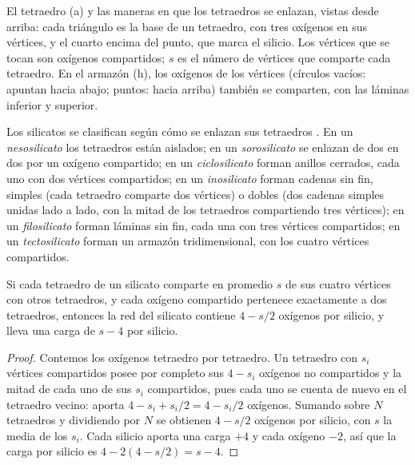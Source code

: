 \begin{omfigure}
{\small El tetraedro  (a) y las maneras en que los tetraedros se enlazan, vistas desde arriba:
cada triángulo es la base de un tetraedro, con tres oxígenos en sus vértices, y el cuarto encima del
punto, que marca el silicio. Los vértices que se tocan son oxígenos compartidos; $s$ es el número de
vértices que comparte cada tetraedro. En el armazón (h), los oxígenos de los vértices (círculos vacíos:
apuntan hacia abajo; puntos: hacia arriba) también se comparten, con las láminas inferior y superior.}
\end{omfigure}

\begin{definition}\label{def:b1:rock-forming-minerals:silicate-classes}
Los silicatos se clasifican según cómo se enlazan sus tetraedros . En un
\emph{nesosilicato} los tetraedros están aislados; en un
\emph{sorosilicato} se enlazan de dos en dos por un oxígeno compartido; en un
\emph{ciclosilicato} forman anillos cerrados, cada uno con dos vértices compartidos;
en un \emph{inosilicato} forman cadenas sin fin, simples (cada tetraedro comparte dos
vértices) o dobles (dos cadenas simples unidas lado a lado, con la mitad de los tetraedros compartiendo
tres vértices); en un \emph{filosilicato} forman láminas sin fin, cada una con tres
vértices compartidos; en un \emph{tectosilicato} forman un armazón tridimensional,
con los cuatro vértices compartidos.
\end{definition}

\begin{proposition}\label{prop:b1:rock-forming-minerals:si-o}
Si cada tetraedro  de un silicato comparte en promedio $s$ de sus cuatro vértices con otros
tetraedros, y cada oxígeno compartido pertenece exactamente a dos tetraedros, entonces la red del silicato
contiene $4 - s/2$ oxígenos por silicio, y lleva una carga de $s - 4$ por silicio.
\end{proposition}

\begin{proof}
Contemos los oxígenos tetraedro por tetraedro. Un tetraedro con $s_i$ vértices compartidos posee por
completo sus $4 - s_i$ oxígenos no compartidos y la mitad de cada uno de sus $s_i$ compartidos, pues cada
uno se cuenta de nuevo en el tetraedro vecino: aporta $4 - s_i + s_i/2 = 4 - s_i/2$ oxígenos. Sumando
sobre $N$ tetraedros y dividiendo por $N$ se obtienen $4 - s/2$ oxígenos por silicio, con $s$ la media de los
$s_i$. Cada silicio aporta una carga $+4$ y cada oxígeno $-2$, así que la carga por silicio es
$4 - 2(4 - s/2) = s - 4$.
\end{proof}

